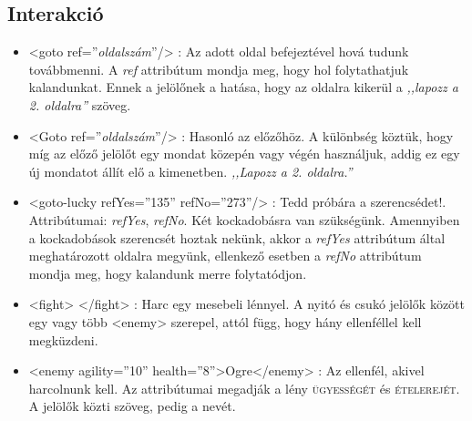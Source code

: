 \documentclass[12pt,a4paper,oneside]{report}
\newcommand{\xtag}[1]{{\color{Tag}#1}}
\newcommand{\xattr}[2]{{\color{Attr}#1}={\color{Value}''#2''}}
\newcommand{\stat}{\textsc}
\newcommand{\attr}{\emph}
\begin{document}
            
    \subsection{Interakció}
      \begin{itemize}
        \item <\xtag{goto} \xattr{ref}{\emph{oldalszám}}/>          
          : Az adott oldal befejeztével hová tudunk továbbmenni. A
          \attr{ref} attribútum mondja meg, hogy hol folytathatjuk
          kalandunkat. Ennek a jelölőnek a hatása, hogy az oldalra
          kikerül a \emph{,,lapozz a 2. oldalra''} szöveg.
    
        \item <\xtag{Goto} \xattr{ref}{\emph{oldalszám}}/>          
          : Hasonló az előzőhöz. A különbség köztük, hogy míg az
          előző jelölőt egy mondat közepén vagy végén használjuk,
          addig ez egy új mondatot állít elő a
          kimenetben. \emph{,,Lapozz a 2. oldalra.''}
    
        \item <\xtag{goto-lucky} \xattr{refYes}{135} \xattr{refNo}{273}/>
          : Tedd próbára a
          szerencsédet!. Attribútumai: \attr{refYes}, \attr{refNo}. Két
          kockadobásra van szükségünk. Amennyiben a kockadobások
          szerencsét hoztak nekünk, akkor a \attr{refYes} attribútum
          által meghatározott oldalra megyünk, ellenkező esetben a
          \attr{refNo} attribútum mondja meg, hogy kalandunk merre
          folytatódjon.

        \item <\xtag{f{}ight}> <\xtag{/f{}ight}> : Harc egy
          mesebeli lénnyel. A nyitó és csukó jelölők között egy vagy
          több <\xtag{enemy}> szerepel, attól függ, hogy hány ellenféllel
          kell megküzdeni.
        \item <\xtag{enemy} \xattr{agility}{10} \xattr{health}{8}>Ogre<\xtag{/enemy}>
          : Az ellenfél, akivel harcolnunk kell. Az attribútumai
          megadják a lény \stat{ügyességét} és \stat{ételerejét}. A
          jelölők közti szöveg, pedig a nevét.
      \end{itemize}
      
\end{document}

